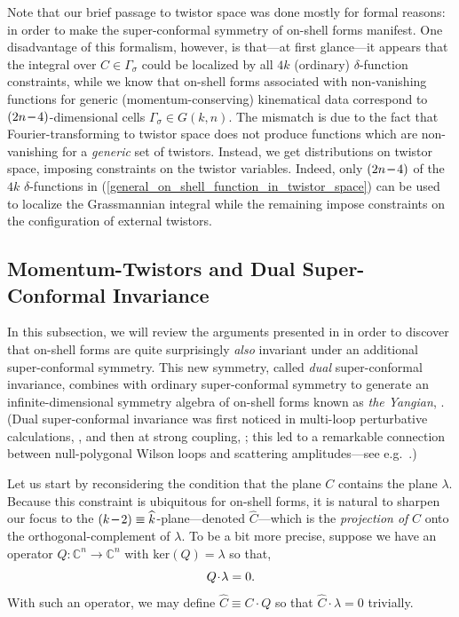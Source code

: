 \documentclass[12pt,hyperref,compress]{JHEP3}
\renewcommand{\hat}{\widehat}
\newcommand{\eq}[1]{\begin{equation}#1\end{equation}}
\newcommand{\mi}{{\rm\rule[2.4pt]{6pt}{0.65pt}}}
\begin{document}
{Note that our brief passage to twistor space was done mostly for formal reasons: in order to make the super-conformal symmetry of on-shell forms manifest. One disadvantage of this formalism, however, is that---at first glance---it appears that the integral over $C\!\in\!\Gamma_\sigma$ could be localized by all $4k$ (ordinary) $\delta$-function constraints, while we know that on-shell forms associated with non-vanishing functions for generic (momentum-conserving) kinematical data correspond to $(2n\,\mi\,4)$-dimensional cells $\Gamma_\sigma\!\in\!G(k,n)$. The mismatch is due to the fact that Fourier-transforming to twistor space does not produce functions which are non-vanishing for a {\it generic} set of twistors. Instead, we get distributions on twistor space, imposing constraints on the twistor variables. Indeed, only $(2n\,\mi\,4)$ of the $4k$ \mbox{$\delta$-functions} in (\ref{general_on_shell_function_in_twistor_space}) can be used to localize the Grassmannian integral while the remaining impose constraints on the configuration of external twistors.







\subsection{Momentum-Twistors and  Dual Super-Conformal Invariance}\label{momentum_twistors_subsection}
In this subsection, we will review the arguments presented in \cite{ArkaniHamed:2009vw} in order to discover that on-shell forms are quite surprisingly {\it also} invariant under an additional super-conformal symmetry. This new symmetry, called {\it dual} super-conformal invariance, combines with ordinary super-conformal symmetry to generate an infinite-dimensional symmetry algebra of on-shell forms known as {\it the Yangian}, \cite{Drummond:2009fd,Drummond:2010uq,Drummond:2010qh,Beisert:2010gn}. (Dual super-conformal invariance was first noticed in multi-loop perturbative calculations, \cite{Drummond:2006rz}, and then at strong coupling, \cite{Alday:2007hr}; this led to a remarkable connection between null-polygonal Wilson loops and scattering amplitudes---see e.g.\ \cite{Alday:2007hr,Alday:2007he,Brandhuber:2007yx,Drummond:2007aua,Drummond:2007cf,Drummond:2007bm,Drummond:2008aq,Bern:2008ap,Alday:2009yn}.)

Let us start by reconsidering the condition that the plane $C$ contains the plane $\lambda$. Because this constraint is ubiquitous for on-shell forms, it is natural to sharpen our focus to the $(k\,\mi\,2)\equiv\hat{k}$-plane---denoted $\hat{C}$---which is the {\it projection of} $C$ onto the orthogonal-complement of $\lambda$. To be a bit more precise, suppose we have an operator \mbox{$Q\!:\!\mathbb{C}^n\!\to\!\mathbb{C}^n$} with $\mathrm{ker}(Q)=\lambda$ so that, \vspace{-.3cm}\eq{Q\!\cdot\!\lambda=0.\vspace{-.2cm}} With such an operator, we may define $\hat{C}\equiv C\!\cdot\!Q$ so that $\hat{C}\!\cdot\!\lambda=0$ trivially.

}
\end{document}
